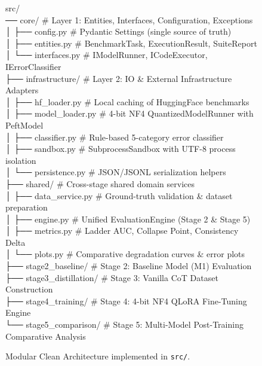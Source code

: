 \documentclass[12pt, a4paper]{article}
\begin{document}
\begin{figure}[H]
\centering
\begin{tcolorbox}[colback=DarkBG!95, colframe=OrangeMain, arc=3pt, width=\textwidth]
\color{white}\small\ttfamily
src/\\
\├── core/                      \textcolor{MidGray}{\# Layer 1: Entities, Interfaces, Configuration, Exceptions}\\
│   ├── config.py              \textcolor{OrangeLight}{\# Pydantic Settings (single source of truth)}\\
│   ├── entities.py            \textcolor{OrangeLight}{\# BenchmarkTask, ExecutionResult, SuiteReport}\\
│   └── interfaces.py          \textcolor{OrangeLight}{\# IModelRunner, ICodeExecutor, IErrorClassifier}\\
├── infrastructure/            \textcolor{MidGray}{\# Layer 2: IO \& External Infrastructure Adapters}\\
│   ├── hf\_loader.py           \textcolor{OrangeLight}{\# Local caching of HuggingFace benchmarks}\\
│   ├── model\_loader.py        \textcolor{OrangeLight}{\# 4-bit NF4 QuantizedModelRunner with PeftModel}\\
│   ├── classifier.py          \textcolor{OrangeLight}{\# Rule-based 5-category error classifier}\\
│   ├── sandbox.py             \textcolor{OrangeLight}{\# SubprocessSandbox with UTF-8 process isolation}\\
│   └── persistence.py         \textcolor{OrangeLight}{\# JSON/JSONL serialization helpers}\\
├── shared/                    \textcolor{MidGray}{\# Cross-stage shared domain services}\\
│   ├── data\_service.py        \textcolor{OrangeLight}{\# Ground-truth validation \& dataset preparation}\\
│   ├── engine.py              \textcolor{OrangeLight}{\# Unified EvaluationEngine (Stage 2 \& Stage 5)}\\
│   ├── metrics.py             \textcolor{OrangeLight}{\# Ladder AUC, Collapse Point, Consistency Delta}\\
│   └── plots.py               \textcolor{OrangeLight}{\# Comparative degradation curves \& error plots}\\
├── stage2\_baseline/           \textcolor{MidGray}{\# Stage 2: Baseline Model (M1) Evaluation}\\
├── stage3\_distillation/       \textcolor{MidGray}{\# Stage 3: Vanilla CoT Dataset Construction}\\
├── stage4\_training/           \textcolor{MidGray}{\# Stage 4: 4-bit NF4 QLoRA Fine-Tuning Engine}\\
└── stage5\_comparison/         \textcolor{MidGray}{\# Stage 5: Multi-Model Post-Training Comparative Analysis}
\end{tcolorbox}
\caption{Modular Clean Architecture implemented in \texttt{src/}.}
\label{fig:arch_tree}
\end{figure}
\end{document}
